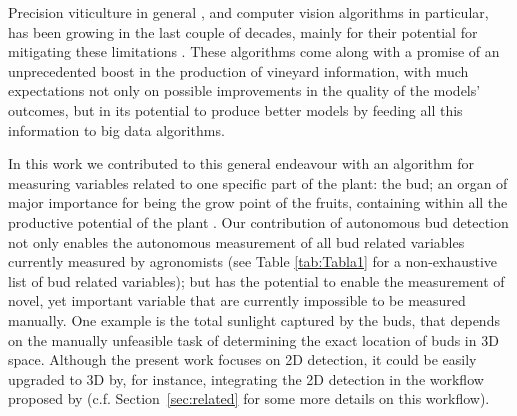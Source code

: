 \documentclass[a4paper,authoryear,review]{elsarticle}
\begin{document}
	Precision viticulture in general \citep{bramley2009lessons}, and computer vision algorithms in particular, has been growing in the last couple of decades, mainly for their potential for mitigating these limitations \citep{seng2018computer, matese2015technology}. These algorithms come along with a promise of an unprecedented boost in the production of vineyard information, with much expectations not only on possible improvements in the quality of the models’ outcomes, but in its potential to produce better models by feeding all this information to big data algorithms. 
	
	In this work we contributed to this general endeavour with an algorithm for measuring variables related to one specific part of the plant: the bud; an organ of major importance for being the grow point of the fruits, containing within all the productive potential of the plant \citep{may2000bud}. Our contribution of  autonomous bud detection not only enables the autonomous measurement of all bud related variables currently measured by agronomists (see Table  \ref{tab:Tabla1} for a non-exhaustive list of bud related variables); but has the potential to enable the measurement of novel, yet important variable  that are currently impossible to be measured manually. One example is the total sunlight captured by the buds, that depends on the manually unfeasible task of determining the exact location of buds in 3D space.  Although the present work focuses on 2D detection, it could be easily upgraded to 3D by, for instance, integrating the 2D detection in the workflow proposed by \cite{diaz2018grapevine} (c.f. Section~\ref{sec:related} for some more details on this workflow).
	
\end{document}
